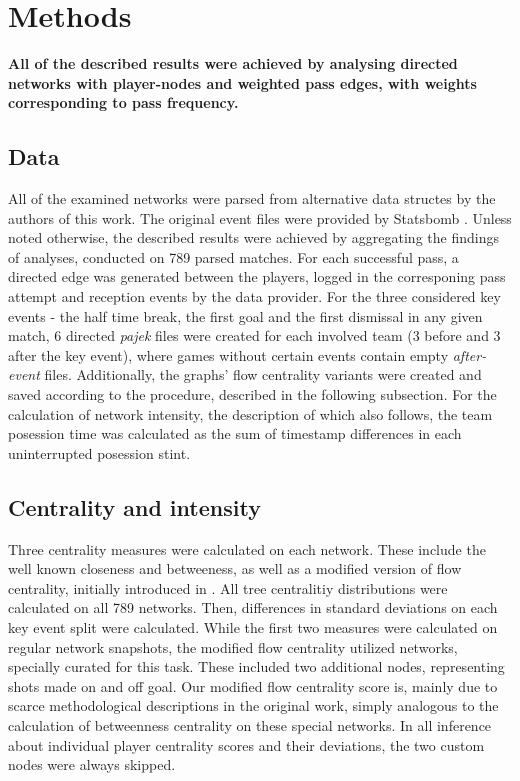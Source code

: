 \documentclass[9pt,twocolumn,twoside]{pnas-report}
\begin{document}
{\small\section*{Methods}

{\bf All of the described results were achieved by analysing directed networks with player-nodes and weighted pass edges, with weights corresponding to pass frequency.} 

\subsection*{Data}
All of the examined networks were parsed from alternative data structes by the authors of this work. The original event files were provided by Statsbomb \cite{statsbomb}. Unless noted otherwise, the described results were achieved by aggregating the findings of analyses, conducted on 789 parsed matches. For each successful pass, a directed edge was generated between the players, logged in the corresponing pass attempt and reception events by the data provider. For the three considered key events - the half time break, the first goal and the first dismissal in any given match, 6 directed \textit{pajek} files were created for each involved team (3 before and 3 after the key event), where games without certain events contain empty \textit{after-event} files. Additionally, the graphs' flow centrality variants were created and saved according to the procedure, described in the following subsection. For the calculation of network intensity, the description of which also follows, the team posession time was calculated as  the sum of timestamp differences in each uninterrupted posession stint.

\subsection*{Centrality and intensity}
Three centrality measures were calculated on each network. These include the well known closeness and betweeness, as well as a modified version of flow centrality, initially introduced in \cite{duch2010quantifying}. All tree centralitiy distributions were calculated on all 789 networks. Then, differences in standard deviations on each key event split were calculated. While the first two measures were calculated on regular network snapshots, the modified flow centrality utilized networks, specially curated for this task. These included two additional nodes, representing shots made on and off goal. Our modified flow centrality score is, mainly due to scarce methodological descriptions in the original work, simply analogous to the calculation of betweenness centrality on these special networks. In all inference about individual player centrality scores and their deviations, the two custom nodes were always skipped.

}
\end{document}
